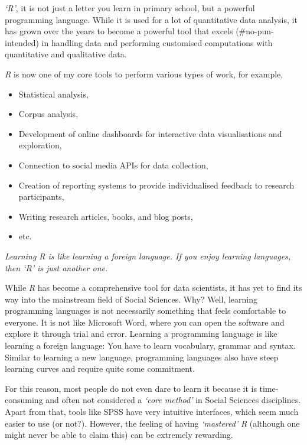 \documentclass[
  letterpaper,
]{krantz}
\providecommand{\tightlist}{%
  \setlength{\itemsep}{0pt}\setlength{\parskip}{0pt}}\usepackage{longtable,booktabs,array}
\renewenvironment{quote}{\begin{VF}}{\end{VF}}
\begin{document}
\emph{`R'}, it is not just a letter you learn in primary school, but a
powerful programming language. While it is used for a lot of
quantitative data analysis, it has grown over the years to become a
powerful tool that excels (\#no-pun-intended) in handling data and
performing customised computations with quantitative and qualitative
data.

\emph{R} is now one of my core tools to perform various types of work,
for example,

\begin{itemize}
\tightlist
\item
  Statistical analysis,
\item
  Corpus analysis,
\item
  Development of online dashboards for interactive data visualisations
  and exploration,
\item
  Connection to social media APIs for data collection,
\item
  Creation of reporting systems to provide individualised feedback to
  research participants,
\item
  Writing research articles, books, and blog posts,
\item
  etc.
\end{itemize}

\begin{quote}
\emph{Learning R is like learning a foreign language. If you enjoy
learning languages, then `R' is just another one.}
\end{quote}

While \emph{R} has become a comprehensive tool for data scientists, it
has yet to find its way into the mainstream field of Social Sciences.
Why? Well, learning programming languages is not necessarily something
that feels comfortable to everyone. It is not like Microsoft Word, where
you can open the software and explore it through trial and error.
Learning a programming language is like learning a foreign language: You
have to learn vocabulary, grammar and syntax. Similar to learning a new
language, programming languages also have steep learning curves and
require quite some commitment.

For this reason, most people do not even dare to learn it because it is
time-consuming and often not considered a \emph{`core method'} in Social
Sciences disciplines. Apart from that, tools like SPSS have very
intuitive interfaces, which seem much easier to use (or not?). However,
the feeling of having \emph{`mastered'} \emph{R} (although one might
never be able to claim this) can be extremely rewarding.
\end{document}
